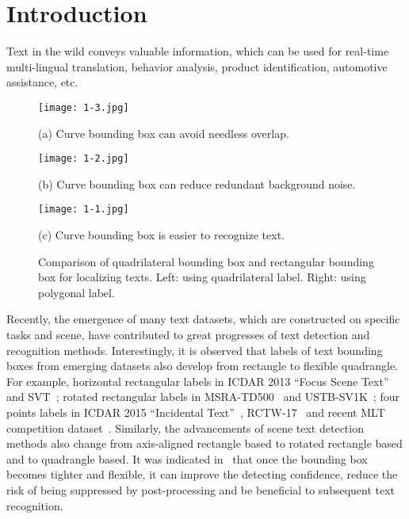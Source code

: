 \documentclass[10pt,twocolumn,letterpaper]{article}
\begin{document}
\section{Introduction}

Text in the wild conveys valuable information, which can be used for real-time multi-lingual translation, behavior analysis, product identification, automotive assistance, etc.
\begin{figure}[htb]
\begin{minipage}[c]{01\linewidth}
  \centering
  \centerline{\texttt{[image: 1-3.jpg]}}
  \centerline{\small{(a) Curve bounding box can avoid needless overlap. }}\medskip
\end{minipage}
\vfill  \begin{minipage}[c]{01\linewidth}
  \centering
  \centerline{\texttt{[image: 1-2.jpg]}}
  \centerline{\small{(b) Curve bounding box can reduce redundant background noise.}}\medskip
\end{minipage}
\vfill  \begin{minipage}[c]{01\linewidth}
  \centering
  \centerline{\texttt{[image: 1-1.jpg]}}
  \centerline{\small{(c) Curve bounding box is easier to recognize text. }}\medskip
\end{minipage}

\caption{Comparison of quadrilateral bounding box and rectangular bounding box for localizing texts. Left: using quadrilateral label. Right: using polygonal label.}\label{fig:background}
\end{figure}
Recently, the emergence of many text datasets, which are constructed on specific tasks and scene, have contributed to great progresses of text detection and recognition methods. Interestingly, it is observed that labels of text bounding boxes from emerging datasets also develop from rectangle to flexible quadrangle. For example, horizontal rectangular labels in ICDAR 2013 ``Focus Scene Text''~\cite{Karatzas2013ICDAR} and SVT~\cite{wang2010word}; rotated rectangular labels in MSRA-TD500~\cite{Yao2012Detecting} and USTB-SV1K~\cite{Yin2015Multi}; four points labels in ICDAR 2015 ``Incidental Text''~\cite{karatzas2015icdar}, RCTW-17~\cite{Shi2017ICDAR2017} and recent MLT competition dataset~\cite{mlt2017icdar}. Similarly, the advancements of scene text detection methods also change from axis-aligned rectangle based to rotated rectangle based and to quadrangle based. It was indicated in~\cite{liu2017deep} that once the bounding box becomes tighter and flexible, it can improve the detecting confidence, reduce the risk of being suppressed by post-processing and be beneficial to subsequent text recognition.
\end{document}

